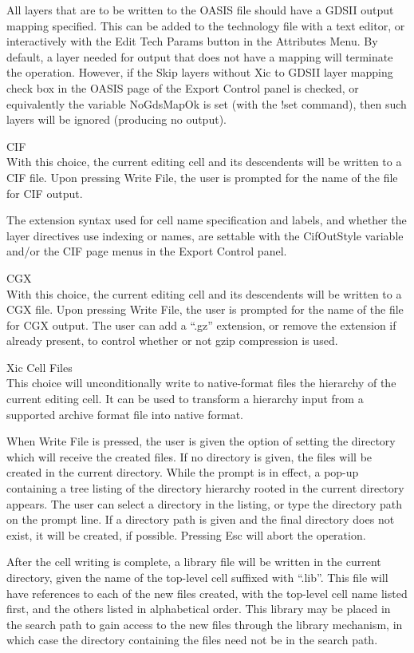 \begin{description}
All layers that are to be written to the OASIS file should have a
GDSII output mapping specified.  This can be added to the technology
file with a text editor, or interactively with the {\cb Edit Tech
Params} button in the {\cb Attributes Menu}.  By default, a layer
needed for output that does not have a mapping will terminate the
operation.  However, if the {\cb Skip layers without Xic to GDSII
layer mapping} check box in the {\cb OASIS} page of the {\cb Export
Control} panel is checked, or equivalently the variable {\et
NoGdsMapOk} is set (with the {\cb !set} command), then such layers
will be ignored (producing no output).

\item{\cb CIF}\\
With this choice, the current editing cell and its descendents will be
written to a CIF file.  Upon pressing {\cb Write File}, the user is
prompted for the name of the file for CIF output.

The extension syntax used for cell name specification and labels, and
whether the layer directives use indexing or names, are settable with
the {\et CifOutStyle} variable and/or the {\cb CIF} page menus in the
{\cb Export Control} panel.

\item{\cb CGX}\\
With this choice, the current editing cell and its descendents will be
written to a CGX file.  Upon pressing {\cb Write File}, the user is
prompted for the name of the file for CGX output.  The user can add a
``{\vt .gz}'' extension, or remove the extension if already present,
to control whether or not {\vt gzip} compression is used.

\item{\cb Xic Cell Files}\\
This choice will unconditionally write to native-format files the
hierarchy of the current editing cell.  It can be used to transform a
hierarchy input from a supported archive format file into {\Xic}
native format.

When {\cb Write File} is pressed, the user is given the option of
setting the directory which will receive the created files.  If no
directory is given, the files will be created in the current
directory.  While the prompt is in effect, a pop-up containing a tree
listing of the directory hierarchy rooted in the current directory
appears.  The user can select a directory in the listing, or type the
directory path on the prompt line.  If a directory path is given and
the final directory does not exist, it will be created, if possible. 
Pressing {\kb Esc} will abort the operation.

After the cell writing is complete, a library file will be written in
the current directory, given the name of the top-level cell suffixed
with ``{\vt .lib}''.  This file will have references to each of the
new files created, with the top-level cell name listed first, and the
others listed in alphabetical order.  This library may be placed in
the search path to gain access to the new files through the library
mechanism, in which case the directory containing the files need not
be in the search path.
\end{description}

